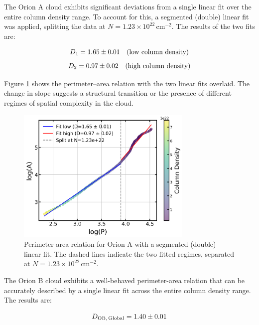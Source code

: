 The Orion A cloud exhibits significant deviations from a single linear fit over the entire column density range. To account for this, a segmented (double) linear fit was applied, splitting the data at $N = 1.23 \times 10^{22}\,\mathrm{cm}^{-2}$. The results of the two fits are:

\begin{equation}
    \notag
    D_1 = 1.65 \pm 0.01 \quad \text{(low column density)}
\end{equation}
\begin{equation}
    \notag
    D_2 = 0.97 \pm 0.02 \quad \text{(high column density)}
\end{equation}

Figure \ref{fig:orion_A_global_double_fit} shows the perimeter--area relation with the two linear fits overlaid. The change in slope suggests a structural transition or the presence of different regimes of spatial complexity in the cloud.
\begin{figure}[t]
    \centering
    \includegraphics[width=0.75\textwidth]{figures/orion_A_global_double_fit.png}
    \caption{Perimeter-area relation for Orion A with a segmented (double) linear fit. The dashed lines indicate the two fitted regimes, separated at $N=1.23 \times 10^{22}\,\mathrm{cm}^{-2}$.}
    \label{fig:orion_A_global_double_fit}
\end{figure}

The Orion B cloud exhibits a well-behaved perimeter-area relation that can be accurately described by a single linear fit across the entire column density range. The results are:

\begin{equation}
    \notag
    D_{\mathrm{OB,\,Global}} = 1.40 \pm 0.01
\end{equation}

